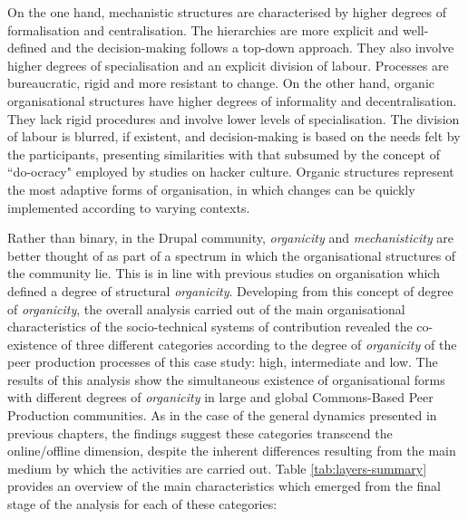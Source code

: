 On the one hand, mechanistic structures are characterised by higher degrees of formalisation and centralisation. The hierarchies are more explicit and well-defined and the decision-making follows a top-down approach. They also involve higher degrees of specialisation and an explicit division of labour. Processes are bureaucratic, rigid and more resistant to change. On the other hand, organic organisational structures have higher degrees of informality and decentralisation. They lack rigid procedures and involve lower levels of specialisation. The division of labour is blurred, if existent, and decision-making is based on the needs felt by the participants, presenting similarities with that subsumed by the concept of ``do-ocracy" employed by studies on hacker culture. Organic structures represent the most adaptive forms of organisation, in which changes can be quickly implemented according to varying contexts.

Rather than binary, in the Drupal community, \textit{organicity} and \textit{mechanisticity} are better thought of as part of a spectrum in which the organisational structures of the community lie. This is in line with previous studies on organisation \parencite{harrison1972professional, bahrami1987stratocracy, louadi1998relationship, green2008exploring, ireland2009conceptualizing, chelliah2010determinants, mallen2016organicity} which defined a degree of structural \textit{organicity}. Developing from this concept of degree of \textit{organicity}, the overall analysis carried out of the main organisational characteristics of the socio-technical systems of contribution revealed the co-existence of three different categories according to the degree of \textit{organicity} of the peer production processes of this case study: high, intermediate and low. The results of this analysis show the simultaneous existence of organisational forms with different degrees of \textit{organicity} in large and global Commons-Based Peer Production communities. As in the case of the general dynamics presented in previous chapters, the findings suggest these categories transcend the online/offline dimension, despite the inherent differences resulting from the main medium by which the activities are carried out. Table \ref{tab:layers-summary} provides an overview of the main characteristics which emerged from the final stage of the analysis for each of these categories:

